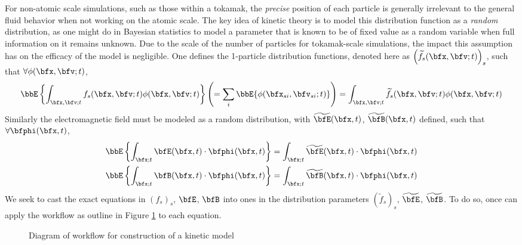     For non-atomic scale simulations, such as those within a tokamak, the \emph{precise} position of each particle is generally irrelevant to the general fluid behavior when not working on the atomic scale. The key idea of kinetic theory is to model this distribution function as a \emph{random} distribution, as one might do in Bayesian statistics to model a parameter that is known to be of fixed value as a random variable when full information on it remains unknown. Due to the scale of the number of particles for tokamak-scale simulations, the impact this assumption has on the efficacy of the model is negligible. One defines the 1-particle distribution functions, denoted here as $\left(\widetilde{f}_{s}(\bfx, \bfv; t)\right)_{s}$, such that $\forall \phi(\bfx, \bfv; t)$,
    \begin{equation}
        \bbE\left\{\int_{\bfx, \bfv; t}f_{s}(\bfx, \bfv; t)\phi(\bfx, \bfv; t)\right\}
        \left(=  \sum_{i}\bbE\{\phi(\bfx_{si}, \bfv_{si}; t)\}\right)
        =  \int_{\bfx, \bfv; t}\widetilde{f}_{s}(\bfx, \bfv; t)\phi(\bfx, \bfv;t )
    \end{equation}
    Similarly the electromagnetic field must be modeled as a random distribution, with $\widetilde{\bfE}(\bfx, t)$, $\widetilde{\bfB}(\bfx, t)$ defined, such that $\forall \bfphi(\bfx, t)$,
    \begin{align}
        \bbE\left\{\int_{\bfx; t}\bfE(\bfx, t)\cdot\bfphi(\bfx, t)\right\}  =  \int_{\bfx; t}\widetilde{\bfE}(\bfx, t)\cdot\bfphi(\bfx, t)  \\ 
        \bbE\left\{\int_{\bfx; t}\bfB(\bfx, t)\cdot\bfphi(\bfx, t)\right\}  =  \int_{\bfx; t}\widetilde{\bfB}(\bfx, t)\cdot\bfphi(\bfx, t)
    \end{align}
    We seek to cast the exact equations in $(f_{s})_{s}$, $\bfE$, $\bfB$ into ones in the distribution parameters $\left(\widetilde{f}_{s}\right)_{s}$, $\widetilde{\bfE}$, $\widetilde{\bfB}$. To do so, once can apply the workflow as outline in Figure \ref{fig:kinetic model construction workflow} to each equation.
    \begin{figure}[!ht]
        \centering
        \caption{Diagram of workflow for construction of a kinetic model}
        \label{fig:kinetic model construction workflow}
    \end{figure}

